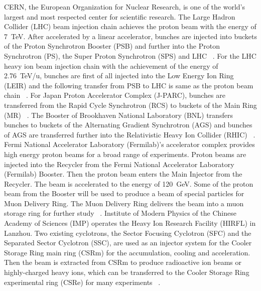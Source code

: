 \gls{CERN}, the European Organization for Nuclear Research, is one of the world's largest and most respected center for scientific research. The Large Hadron Collider (\gls{LHC}) beam injection chain achieves the proton beam with the energy of \SI{7}{TeV}. After accelerated by a linear accelerator, bunches are injected into buckets of the Proton Synchrotron Booster (\gls{PSB}) and further into the Proton Synchrotron (\gls{PS}), the Super Proton Synchrotron (\gls{SPS}) and LHC ~\cite{ferrand_synchronization_2015}. For the LHC heavy ion beam injection chain with the achievement of the energy of \SI{2.76}{TeV/u}, bunches are first of all injected into the Low Energy Ion Ring (\gls{LEIR}) and the following transfer from PSB to LHC is same as the proton beam chain ~\cite{ferrand_synchronization_2015}. For Japan Proton Accelerator Complex (\gls{J-PARC}), bunches are transferred from the Rapid Cycle Synchrotron (\gls{RCS}) to buckets of the Main Ring (\gls{MR}) ~\cite{_j-parc_????}. The Booster of Brookhaven National Laboratory (\gls{BNL}) transfers bunches to buckets of the Alternating Gradient Synchrotron (\gls{AGS}) and bunches of AGS are transferred further into the Relativistic Heavy Ion Collider (\gls{RHIC}) ~\cite{_brookhaven_????}. Fermi National Accelerator Laboratory (\gls{Fermilab})'s accelerator complex provides high energy proton beams for a broad range of experiments. Proton beams are injected into the Recycler from the Fermi National Accelerator Laboratory (\gls{Fermilab}) Booster. Then the proton beam enters the Main Injector from the Recycler. The beam is accelerated to the energy of \SI{120}{GeV}. Some of the proton beam from the Booster will be used to produce a beam of special particles for Muon Delivery Ring. The Muon Delivery Ring delivers the beam into a muon storage ring for further study ~\cite{_fermi_????}. Institute of Modern Physics of the Chinese Academy of Sciences (\gls{IMP}) operates the Heavy Ion Research Facility (\gls{HIRFL}) in Lanzhou. Two existing cyclotrons, the Sector Focusing Cyclotron (\gls{SFC}) and the Separated Sector Cyclotron (\gls{SSC}), are used as an injector system for the Cooler Storage Ring main ring (\gls{CSRm}) for the accumulation, cooling and acceleration. Then the beam is extracted from CSRm to produce radioactive ion beams or highly-charged heavy ions, which can be transferred to the Cooler Storage Ring experimental ring (\gls{CSRe}) for many experiments ~\cite{_institute_????, man_survey_2002}.  

